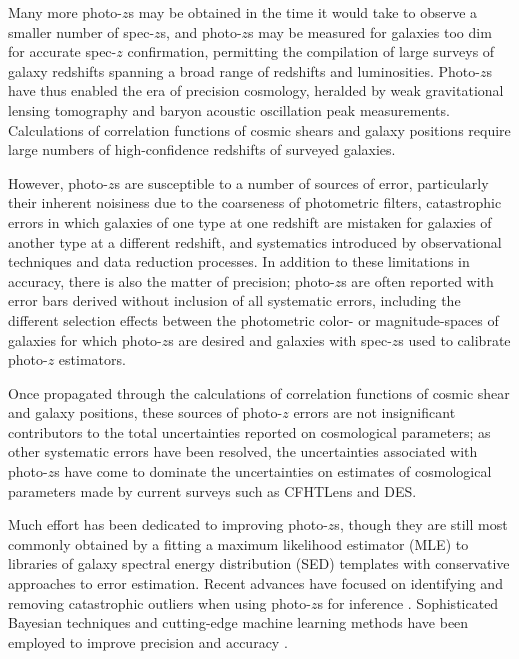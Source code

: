 \documentclass[preprint]{aastex}
\begin{document}
Many more photo-$z$s may be obtained in the time it would take to observe a 
smaller number of spec-$z$s, and photo-$z$s may be measured for galaxies too 
dim for accurate spec-$z$ confirmation, permitting the compilation of large 
surveys of galaxy redshifts spanning a broad range of redshifts and 
luminosities.  Photo-$z$s have thus enabled the era of precision cosmology, 
heralded by weak gravitational lensing tomography and baryon acoustic 
oscillation peak measurements.  Calculations of correlation functions of cosmic 
shears and galaxy positions require large numbers of high-confidence redshifts 
of surveyed galaxies.  

However, photo-$z$s are susceptible to a number of sources of error, 
particularly their inherent noisiness due to the coarseness of photometric 
filters, catastrophic errors in which galaxies of one type at one redshift are 
mistaken for galaxies of another type at a different redshift, and systematics 
introduced by observational techniques and data reduction processes.  In 
addition to these limitations in accuracy, there is also the matter of 
precision; photo-$z$s are often reported with error bars derived without 
inclusion of all systematic errors, including the different selection effects 
between the photometric color- or magnitude-spaces of galaxies for which 
photo-$z$s are desired and galaxies with spec-$z$s used to calibrate photo-$z$ 
estimators.

Once propagated through the calculations of correlation functions of cosmic 
shear and galaxy positions, these sources of photo-$z$ errors are not 
insignificant contributors to the total uncertainties reported on cosmological 
parameters; as other systematic errors have been resolved, the uncertainties 
associated with photo-$z$s have come to dominate the uncertainties on estimates 
of cosmological parameters made by current surveys such as CFHTLens and DES.

Much effort has been dedicated to improving photo-$z$s, though they are still 
most commonly obtained by a fitting a maximum likelihood estimator (MLE) to 
libraries of galaxy spectral energy distribution (SED) templates with 
conservative approaches to error estimation.  Recent advances have focused on 
identifying and removing catastrophic outliers when using photo-$z$s for 
inference \citep{Gorecki2014}.  Sophisticated Bayesian techniques and 
cutting-edge machine learning methods have been employed to improve precision 
\citep{Carliles2010} and accuracy \citep{Sadeh2015}. 
\end{document}

